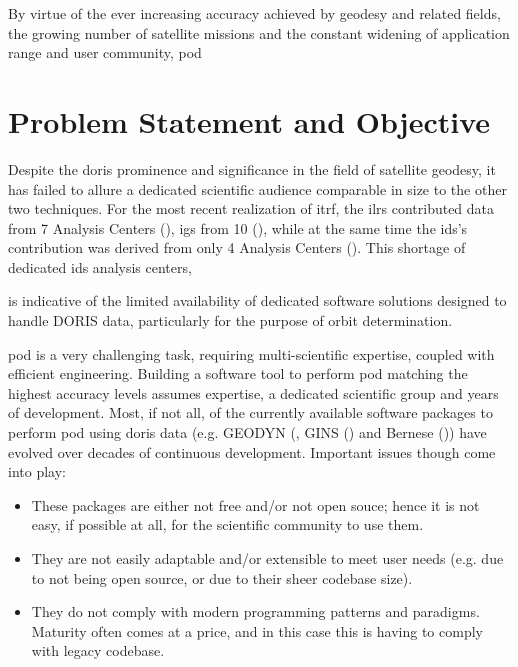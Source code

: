 By virtue of the ever increasing accuracy achieved by geodesy and related fields, 
the growing number of satellite missions and the constant widening of application 
range and user community, \gls{pod} 
\fi

\section{Problem Statement and Objective}\label{ssec:statement-and-objective}

Despite the \gls{doris} prominence and significance in the field of satellite geodesy,
it has failed to allure a dedicated scientific audience comparable in size to 
the other two techniques. For the most recent realization of \gls{itrf}, the 
\gls{ilrs} contributed data from 7 Analysis Centers (\cite{Pavlis2023}), \gls{igs} 
from 10 (\cite{Rebischung2021}), while at the same time the \gls{ids}'s contribution 
was derived from only 4 Analysis Centers (\cite{Moreaux2022}). This shortage of 
dedicated \gls{ids} analysis centers,
\iffalse
also reflects the scarcity in dedicated
software tools to process \gls{doris} data, first and foremost for orbit 
determination. \fi
is indicative of the limited availability of dedicated software solutions designed to handle DORIS data, particularly for the purpose of orbit determination.

\gls{pod} is a very challenging task, requiring multi-scientific expertise,
coupled with efficient engineering. Building a software tool to perform \gls{pod} 
matching the highest accuracy levels assumes expertise, a dedicated scientific 
group and years of development. Most, if not all, of the currently available 
software packages to perform \gls{pod} using \gls{doris} data (e.g. GEODYN (\cite{Geodyn2015}, 
GINS (\cite{Gins2013}) and Bernese (\cite{Stepanek2010})) have evolved over
decades of continuous development. Important issues though come into play:
\begin{itemize}
  \item These packages are either not free and/or not open souce; hence it is not 
    easy, if possible at all, for the scientific community to use them.
  \item They are not easily adaptable and/or extensible to meet user needs (e.g. due 
    to not being open source, or due to their sheer codebase size).
  \item They do not comply with modern programming patterns and paradigms. Maturity 
    often comes at a price, and in this case this is having to comply with legacy 
    codebase.
\end{itemize}


